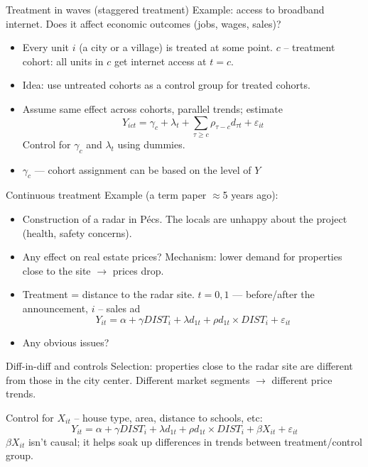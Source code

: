 \documentclass[notes=show,beamer,compress]{beamer}
\begin{document}
\begin{frame}{Treatment in waves (staggered treatment)}
	Example: access to broadband internet. Does it affect economic outcomes (jobs, wages, sales)?
	\begin{itemize}
		\item{Every unit $i$ (a city or a village) is treated at some point. $c$ -- treatment cohort: all units in $c$ get internet access at $t=c$.}
		\item{Idea: use untreated cohorts as a control group for treated cohorts.}
		\item{Assume same effect across cohorts, parallel trends; estimate
			\begin{equation*}
				Y_{ict} = \gamma_c + \lambda_t + \sum_{\tau\geq c}\rho_{\tau-c}d_{\tau t} + \varepsilon_{it}
			\end{equation*}
			Control for $\gamma_c$ and $\lambda_t$ using dummies.}
		\item{$\gamma_c$ --- cohort assignment can be based on the level of $Y$}
	\end{itemize}

\end{frame}

\begin{frame}{Continuous treatment}
Example (a term paper $\approx$5 years ago):
\begin{itemize}
	\item{Construction of a radar in P\'ecs. The locals are unhappy about the project (health, safety concerns).}
	\item{Any effect on real estate prices? Mechanism: lower demand for properties close to the site $\to$ prices drop.}
	\item{Treatment = distance to the radar site. $t=0,1$ --- before/after the announcement, $i$ -- sales ad
	\begin{equation*}
		Y_{it} = \alpha + \gamma{}DIST_i + \lambda{}d_{1t} + \rho{d_{1t}\times{}DIST_i} + \varepsilon_{it}
	\end{equation*}}
	\item{Any obvious issues?}
\end{itemize}
\end{frame}

\begin{frame}{Diff-in-diff and controls}
Selection: properties close to the radar site are different from those in the city center. Different market segments $\to$ different price trends.

Control for $X_{it}$ -- house type, area, distance to schools, etc:
\begin{equation*}
Y_{it} = \alpha + \gamma{}DIST_i + \lambda{}d_{1t} + \rho{d_{1t}\times{}DIST_i} + \beta{}X_{it}+ \varepsilon_{it}
\end{equation*}
$\beta{}X_{it}$ isn't causal; it helps soak up differences in trends between treatment/control group.
\end{frame}
\end{document}
